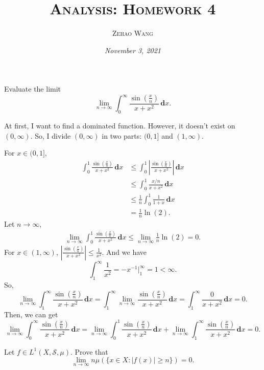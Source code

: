 \documentclass[12pt]{article}
\title{\textsc{Analysis: Homework 4}}
\author{\textsc{Zehao Wang}}
\date{\emph{November 3, 2021}}
\newenvironment{exercise}[1]{\begin{tcolorbox}[colback=black!15, colframe=black!80, breakable, title=#1]}{\end{tcolorbox}}
\newenvironment{solution}{\begin{tcolorbox}[colback=white, colframe=black!50, breakable, title=Solution. ]\setlength{\parskip}{0.8em}}{\end{tcolorbox}}
\newcommand{\der}{\,\mathbf{d}}
\begin{document}
    \maketitle

    \begin{exercise}{1}
        Evaluate the limit
        \[
            \lim_{n\to \infty}\int_0^\infty\frac{\sin\left(\frac{x}{n}\right)}{x+x^2}\der x. 
        \]
    \end{exercise}

    \begin{solution}
        At first, I want to find a dominated function. However, it doesn't exist on $(0,\infty)$. So, I divide $(0,\infty)$ in two parts: $(0,1]$ and $(1,\infty)$. 

        For $x\in (0,1]$, 
        \[
            \begin{aligned}
                \int_0^1\frac{\sin\left(\frac{x}{n}\right)}{x+x^2}\der x & \leqslant\int_0^1\left|\frac{\sin\left(\frac{x}{n}\right)}{x+x^2}\right|\der x\\
                & \leqslant\int_0^1\frac{x/n}{x+x^2}\der x\\
                & \leqslant\frac{1}{n}\int_0^1\frac{1}{1+x}\der x\\
                & =\frac{1}{n}\ln(2). 
            \end{aligned}
        \]
        Let $n\to\infty$, 
        \[
            \begin{aligned}
                \lim_{n\to\infty}\int_0^1\frac{\sin\left(\frac{x}{n}\right)}{x+x^2}\der x \leqslant\lim_{n\to\infty}\frac{1}{n}\ln(2)=0. 
            \end{aligned}
        \]
        For $x\in(1,\infty)$, $\left|\frac{\sin\left(\frac{x}{n}\right)}{x+x^2}\right|\leqslant\frac{1}{x^2}$. And we have
        \[
            \int_1^\infty\frac{1}{x^2}=-x^{-1}\big|_1^\infty=1<\infty. 
        \]
        So, 
        \[
            \lim_{n\to\infty}\int_1^\infty\frac{\sin\left(\frac{x}{n}\right)}{x+x^2}\der x =\int_1^\infty\lim_{n\to\infty}\frac{\sin\left(\frac{x}{n}\right)}{x+x^2}\der x=\int_1^\infty\frac{0}{x+x^2}\der x=0. 
        \]
        Then, we can get
        \[
            \lim_{n\to \infty}\int_0^\infty\frac{\sin\left(\frac{x}{n}\right)}{x+x^2}\der x=\lim_{n\to \infty}\int_0^1\frac{\sin\left(\frac{x}{n}\right)}{x+x^2}\der x+\lim_{n\to \infty}\int_1^\infty\frac{\sin\left(\frac{x}{n}\right)}{x+x^2}\der x=0. 
        \]
    \end{solution}

    \begin{exercise}{2}
        Let $f\in L^1(X,\mathscr{S},\mu)$. Prove that
        \[
            \lim_{n\to\infty}n\mu(\{x\in X: |f(x)|\geqslant n\})=0. 
        \]
        
    \end{exercise}
\end{document}
